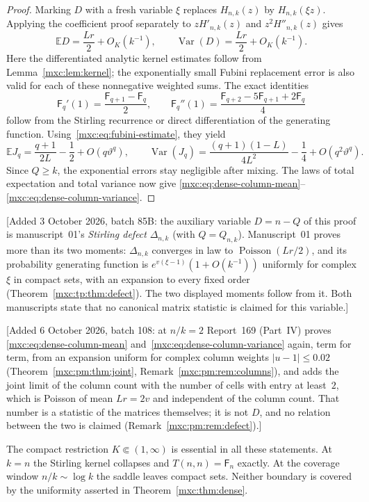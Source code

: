 \documentclass[11pt]{article}
\numberwithin{equation}{section}
\theoremstyle{definition}
\theoremstyle{remark}
\newcommand{\E}{\mathbb E}
\DeclareMathOperator{\Pois}{Poisson}
\DeclareMathOperator{\Var}{Var}
\begin{document}
\begin{proof}
Marking $D$ with a fresh variable $\xi$ replaces $H_{n,k}(z)$ by
$H_{n,k}(\xi z)$. Applying the
coefficient proof separately to $zH'_{n,k}(z)$ and
$z^2H''_{n,k}(z)$ gives
\[
 \E D=\frac{Lr}{2}+O_K(k^{-1}),\qquad
 \Var(D)=\frac{Lr}{2}+O_K(k^{-1}).
\]
Here the differentiated analytic kernel estimates follow from
Lemma~\ref{mxc:lem:kernel}; the exponentially small Fubini replacement
error is also valid for each of these nonnegative weighted sums.
The exact identities
\[
 \mathsf F_q'(1)=\frac{\mathsf F_{q+1}-\mathsf F_q}{2},\qquad
 \mathsf F_q''(1)=\frac{\mathsf F_{q+2}-5\mathsf F_{q+1}
                                    +2\mathsf F_q}{4}
\]
follow from the Stirling recurrence or direct differentiation of the
generating function. Using~\eqref{mxc:eq:fubini-estimate}, they yield
\[
 \E J_q=\frac{q+1}{2L}-\frac12+O(q\vartheta^q),\qquad
 \Var(J_q)=\frac{(q+1)(1-L)}{4L^2}-\frac14+O(q^2\vartheta^q).
\]
Since $Q\ge k$, the exponential errors stay negligible after mixing.
The laws of total expectation and total variance now give
\eqref{mxc:eq:dense-column-mean}--\eqref{mxc:eq:dense-column-variance}.
\end{proof}

[Added 3 October 2026, batch 85B: the auxiliary variable $D=n-Q$ of this
proof is manuscript~01's \emph{Stirling defect} $\Delta_{n,k}$ (with
$Q=Q_{n,k}$). Manuscript~01 proves more than its two moments: $\Delta_{n,k}$
converges in law to $\Pois(Lr/2)$, and its probability generating function
is $e^{v(\xi-1)}(1+O(k^{-1}))$ uniformly for complex $\xi$ in compact sets,
with an expansion to every fixed order (Theorem~\ref{mxc:tp:thm:defect}).
The two displayed moments follow from it. Both manuscripts state that no
canonical matrix statistic is claimed for this variable.]

[Added 6 October 2026, batch 108: at $n/k=2$ Report~169 (Part~IV) proves
\eqref{mxc:eq:dense-column-mean} and~\eqref{mxc:eq:dense-column-variance}
again, term for term, from an expansion uniform for complex column weights
$|u-1|\le0.02$ (Theorem~\ref{mxc:pm:thm:joint}, Remark~\ref{mxc:pm:rem:columns}),
and adds the joint limit of the column count with the number of cells with
entry at least~$2$, which is Poisson of mean $Lr=2v$ and independent of the
column count. That number is a statistic of the matrices themselves; it is not
$D$, and no relation between the two is claimed
(Remark~\ref{mxc:pm:rem:defect}).]

The compact restriction $K\Subset(1,\infty)$ is essential in all
these statements. At $k=n$ the Stirling kernel collapses and
$T(n,n)=\mathsf F_n$ exactly. At the coverage window $n/k\sim\log k$
the saddle leaves compact sets. Neither boundary is covered by the
uniformity asserted in Theorem~\ref{mxc:thm:dense}.
\end{document}
